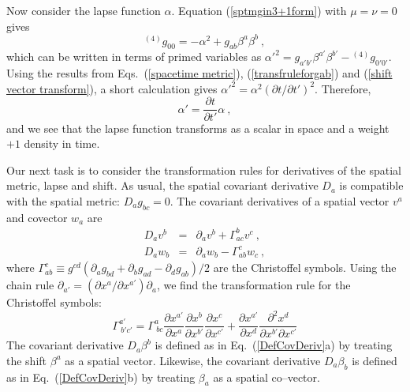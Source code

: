\documentclass[letterpaper,nofootinbib,prd,amsmath,onecolumn]{revtex4-1}
\begin{document}
Now consider the lapse function $\alpha$. Equation (\ref{sptmgin3+1form}) with $\mu = \nu = 0$ gives
\begin{equation}
{}^{(4)}g_{00} = -\alpha^2 + g_{ab}\beta^{a}\beta^{b}\label{lapse} \ ,
\end{equation}
which can be written in terms of primed variables as $\alpha'^2 = g_{a'b'}\beta^{a'}\beta^{b'} - {}^{(4)}g_{0'0'}$. 
Using the results from Eqs.~(\ref{spacetime metric}), (\ref{transfruleforgab}) and (\ref{shift vector transform}), a short calculation gives 
$\alpha'^{2} = \alpha^2 (\partial t/\partial t')^2$. 
Therefore, 
\begin{equation}
\alpha' = \frac{\partial t}{\partial t'}\alpha \ ,\label{lapse transform} 
\end{equation}
and we see that the lapse function transforms as a scalar in space and a weight $+1$ density in time. 
 
Our next task is to consider the transformation rules for derivatives of the spatial metric, lapse and shift. As usual,  the spatial 
covariant derivative $D_a$ is compatible with the spatial metric: $D_a g_{bc} = 0$. The covariant derivatives of a spatial vector $v^a$ and covector $w_a$ 
are 
\begin{subequations}\label{DefCovDeriv}
\begin{eqnarray}
	D_a v^b & = & \partial_a v^b + \Gamma_{ac}^b v^c \ ,\\
	D_a w_b & = & \partial_a w_b - \Gamma_{ab}^c w_c \ ,
\end{eqnarray}
\end{subequations}
where $\Gamma_{ab}^c \equiv g^{cd} ( \partial_a g_{bd} + \partial_b g_{ad} - \partial_d g_{ab})/2$ are the Christoffel symbols. Using the 
chain rule $\partial_{a'} = (\partial x^a/\partial x^{a'}) \partial_a$, we find the transformation rule for the Christoffel symbols:
\begin{equation}\label{ChristoffelTransfRule}
\Gamma^{a'}_{~b'c'} = \Gamma^{a}_{~bc}\frac{\partial x^{a'}}{\partial x^{a}}\frac{\partial x^{b}}{\partial x^{b'}}\frac{\partial x^{c}}{\partial x^{c'}} 
+ \frac{\partial x^{a'}}{\partial x^{d}}\frac{\partial^{2} x^{d}}{\partial x^{b'}\partial x^{c'}}
\end{equation}
The covariant derivative $D_a\beta^b$ is defined as in Eq.~(\ref{DefCovDeriv}a) by treating the shift $\beta^a$ as a spatial vector. Likewise, the covariant 
derivative $D_a\beta_b$ is defined as in Eq.~(\ref{DefCovDeriv}b) by treating $\beta_a$ as a spatial co--vector. 
\end{document}
